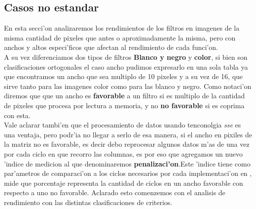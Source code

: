 \subsection{Casos no estandar}
En esta secci'on analizaremos los rendimientos de los filtros en imagenes de la misma cantidad de pixeles que antes
o aproximadamente la misma, pero con anchos y altos especi'ficos que afectan al rendimiento de cada funci'on.\\
A su vez diferenciamos dos tipos de filtros \textbf{Blanco y negro} y \textbf{color}, si bien
son clasificaciones ortogonales el caso ancho pudimos expresarlo en una sola tabla ya que encontramos
un ancho que sea multiplo de 10 pixeles y a su vez de 16, que sirve tanto para las imagenes color como
para las blanco y negro. Como notaci'on diremos que que un ancho es \textbf{favorable} a un filtro si es
 multiplo de la cantidad de pixeles que procesa por lectura a memoria, y no \textbf{no favorable}
si es coprima con esta.\\    
Vale aclarar tambi'en que el procesamiento de datos usando tenconolgia \textit{sse} es una ventaja, pero 
podr'ia no llegar a serlo de esa manera, si el ancho en pixiles de la matriz no es favorable, es decir
debo reprocesar  algunos datos m'as de una vez por cada ciclo en que recorro las columnas, es por eso 
que agregamos un nuevo 'indice de medicion al que denominaremos 
\textbf{penalizaci'on}.Este 'indice tiene como par'ametros de comparaci'on a los ciclos necesarios por
cada implementaci'on en \ass, mide que porcentaje representa la cantidad de ciclos en un ancho 
favorable con respecto a uno no favorable. Aclarado esto comenzemos con el analisis de rendimiento 
con las distintas clasificaciones de criterios.
